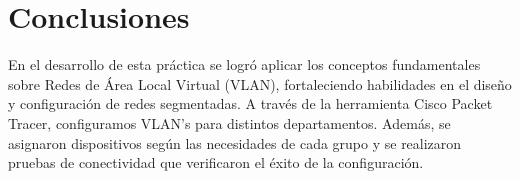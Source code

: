 \section{Conclusiones}
    En el desarrollo de esta práctica se logró aplicar los conceptos fundamentales sobre Redes de Área Local Virtual (VLAN), fortaleciendo habilidades en el diseño y configuración de redes segmentadas. A través de la herramienta Cisco Packet Tracer, configuramos VLAN's para distintos departamentos. Además, se asignaron dispositivos según las necesidades de cada grupo y se realizaron pruebas de conectividad que verificaron el éxito de la configuración.

